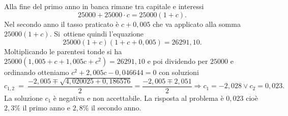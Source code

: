 \begin{soluzione}
Alla fine del primo anno in banca rimane tra capitale e interessi \[25000 +
25000 \cdot c = 25000 ( 1 +c ).\] Nel secondo anno il tasso praticato è 
\(c+0,005\) che va applicato alla somma \(25000(1+c)\). Si~ottiene quindi 
l'equazione \[25000 ( 1 +c ) ( 1 +c +0,005 ) = 26291,10.\]
Moltiplicando le parentesi tonde si ha 
\(25000 ( 1,005 +c +1,005 c +c^{2} ) = 26291,10\) 
e poi dividendo per \(25000\) e ordinando otteniamo
\(c^{2} +2,005 c -0,046644=0\) con soluzioni
{\small
\[c_{1,2}~=~\dfrac{-2,005 \mp \sqrt{4,020025 +0,186576}}{2} = \dfrac{-2,005 
\mp 2,051}{2}\Rightarrow c_{1} = -2,028 \vee c_{2} = 0,023.\]
}
La soluzione \(c_1\) è negativa e non accettabile. 
La risposta al problema è \(0,023\) cioè \(2,3\%\) il primo anno e 
\(2,8\%\) il secondo anno.
\end{soluzione}
% 
% 
% 
